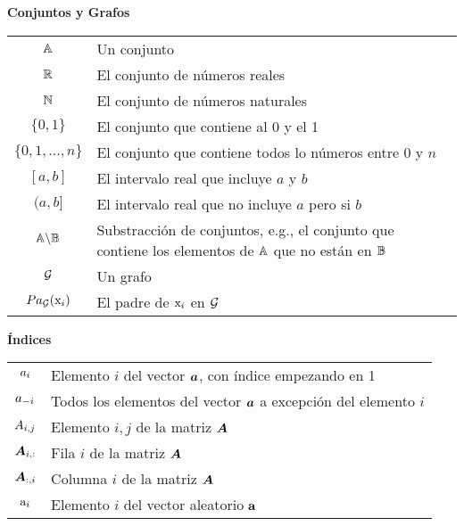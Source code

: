 \vspace{\notationgap}
\begin{minipage}{\textwidth}
\centerline{\bf Conjuntos y Grafos}
\bgroup
\def\arraystretch{1.5}
\begin{tabular}{cp{3.25in}}
$\displaystyle {\mathbb{A}}$ & Un conjunto\\
$\displaystyle \mathbb{R}$ & El conjunto de números reales \\
$\displaystyle \mathbb{N}$ & El conjunto de números naturales \\
$\displaystyle \{0, 1\}$ & El conjunto que contiene al 0 y el 1 \\
$\displaystyle \{0, 1, \dots, n \}$ & El conjunto que contiene todos lo números entre $0$ y $n$\\
$\displaystyle [a, b]$ & El intervalo real que incluye $a$ y $b$\\
$\displaystyle (a, b]$ & El intervalo real que no incluye $a$ pero si $b$ \\
$\displaystyle {\mathbb{A}} \backslash {\mathbb{B}}$ & Substracción de conjuntos, e.g., el conjunto que contiene los elementos de  ${\mathbb{A}}$ que no están en ${\mathbb{B}}$\\
$\displaystyle {\mathcal{G}}$ & Un grafo\\
$\displaystyle Pa_{\mathcal{G}}({\textnormal{x}}_i)$ & El padre de ${\textnormal{x}}_i$ en ${\mathcal{G}}$
\end{tabular}
\egroup
{}
\end{minipage}

\vspace{\notationgap}
\begin{minipage}{\textwidth}
\centerline{\bf Índices}
\bgroup
\def\arraystretch{1.5}
\begin{tabular}{cp{3.25in}}
$\displaystyle {a}_i$ & Elemento $i$ del vector ${\bm{a}}$, con índice empezando en 1\\
$\displaystyle {a}_{-i}$ & Todos los elementos del vector ${\bm{a}}$ a excepción del elemento $i$ \\
$\displaystyle {A}_{i,j}$ & Elemento $i, j$ de la matriz ${\bm{A}}$ \\
$\displaystyle {\bm{A}}_{i, :}$ & Fila $i$ de la matriz ${\bm{A}}$ \\
$\displaystyle {\bm{A}}_{:, i}$ & Columna $i$ de la matriz ${\bm{A}}$ \\
$\displaystyle {\textnormal{a}}_i$ & Elemento $i$ del vector aleatorio ${\mathbf{a}}$ \\
\end{tabular}
\egroup
\end{minipage}

